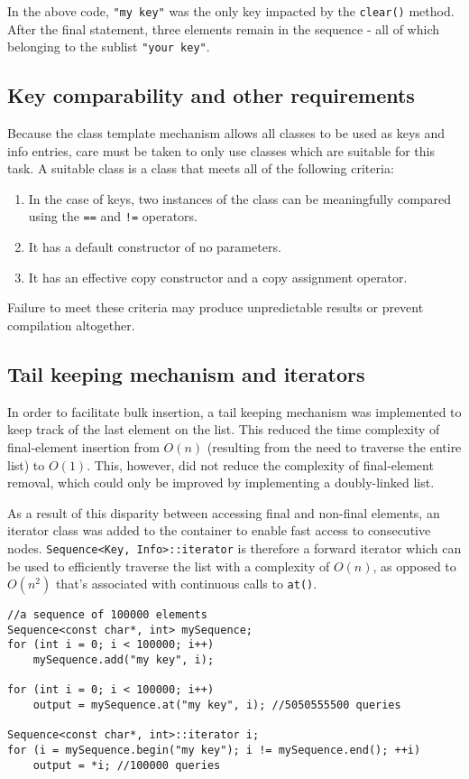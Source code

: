 ﻿\documentclass{article}
\begin{document}
In the above code, {\tt "my key"} was the only key impacted by the {\tt clear()}
method. After the final statement, three elements remain in the sequence - all
of which belonging to the sublist {\tt "your key"}.

\subsection{Key comparability and other requirements}

Because the class template mechanism allows all classes to be used as keys and
info entries, care must be taken to only use classes which are suitable for
this task. A suitable class is a class that meets all of the following criteria:

\begin{enumerate}
\item In the case of keys, two instances of the class can be meaningfully
compared using the {\tt ==} and {\tt !=} operators.
\item It has a default constructor of no parameters.
\item It has an effective copy constructor and a copy assignment operator.
\end{enumerate}

Failure to meet these criteria may produce unpredictable results or prevent
compilation altogether.

\subsection{Tail keeping mechanism and iterators}

In order to facilitate bulk insertion, a tail keeping mechanism was implemented
to keep track of the last element on the list. This reduced the time complexity
of final-element insertion from $O(n)$ (resulting from the need to traverse the
entire list) to $O(1)$. This, however, did not reduce the complexity of
final-element removal, which could only be improved by implementing a
doubly-linked list.

As a result of this disparity between accessing final and non-final elements,
an iterator class was added to the container to enable fast access to
consecutive nodes. {\tt Sequence<Key, Info>::iterator} is therefore a forward
iterator which can be used to efficiently traverse the list with a complexity of
$O(n)$, as opposed to $O(n^2)$ that's associated with continuous calls to
{\tt at()}.

\begin{verbatim}
//a sequence of 100000 elements
Sequence<const char*, int> mySequence;
for (int i = 0; i < 100000; i++)
    mySequence.add("my key", i);

for (int i = 0; i < 100000; i++)
    output = mySequence.at("my key", i); //5050555500 queries

Sequence<const char*, int>::iterator i;
for (i = mySequence.begin("my key"); i != mySequence.end(); ++i)
    output = *i; //100000 queries
\end{verbatim}
\end{document}
